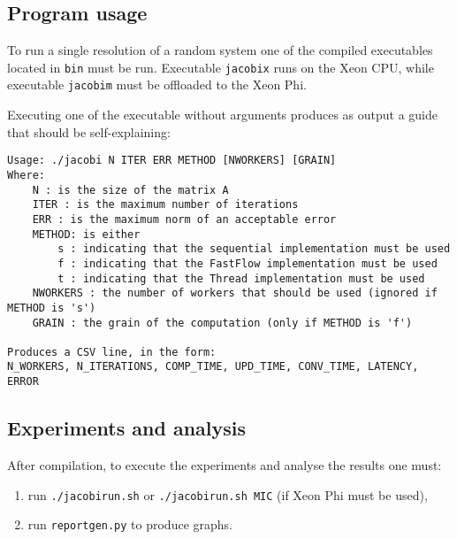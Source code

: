 \subsection{Program usage}
To run a single resolution of a random system one of the compiled executables located in \verb|bin| must be run.
Executable \verb|jacobix| runs on the Xeon CPU, while executable \verb|jacobim| must be offloaded to the Xeon Phi.

Executing one of the executable without arguments produces as output a guide that should be self-explaining:
\begin{lstlisting}
Usage: ./jacobi N ITER ERR METHOD [NWORKERS] [GRAIN]
Where: 
	N : is the size of the matrix A
	ITER : is the maximum number of iterations
	ERR : is the maximum norm of an acceptable error
	METHOD: is either
		s : indicating that the sequential implementation must be used
		f : indicating that the FastFlow implementation must be used
		t : indicating that the Thread implementation must be used
	NWORKERS : the number of workers that should be used (ignored if METHOD is 's')
	GRAIN : the grain of the computation (only if METHOD is 'f')

Produces a CSV line, in the form:
N_WORKERS, N_ITERATIONS, COMP_TIME, UPD_TIME, CONV_TIME, LATENCY, ERROR
\end{lstlisting}

\subsection{Experiments and analysis}
After compilation, to execute the experiments and analyse the results one must:
\begin{enumerate}
	\item run \verb|./jacobirun.sh| or \verb|./jacobirun.sh MIC| (if Xeon Phi must be used), 
	\item run \verb|reportgen.py| to produce graphs.
\end{enumerate}









